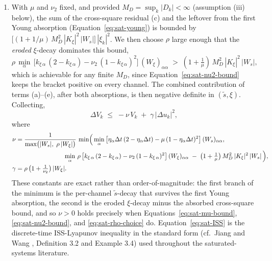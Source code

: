 \documentclass[conf]{new-aiaa}
\begin{document}
\begin{enumerate}
\item With $\mu$ and $\nu_2$ fixed, and provided $M_D = \sup_k |D_k| < \infty$ (assumption (iii) below), the sum of the cross-square residual (c) and the leftover from the first Young absorption (Equation~\ref{eq:sat-young}) is bounded by $\bigl[(1 + 1/\mu)\, M_D^2\, |K_\xi|^2\, |W_s|\bigr]\, |\xi_k|^2$. We then choose $\rho$ large enough that the \emph{eroded} $\xi$-decay dominates this bound,
\begin{equation}
\label{eq:sat-rho-choice}
\rho\, \min_\alpha\, \bigl[ k_{\xi\,\alpha}\,(2 - k_{\xi\,\alpha}) - \nu_2\,(1-k_{\xi\,\alpha})^2 \bigr]\,(W_\xi)_{\alpha\alpha} \;>\; (1 + \tfrac{1}{\mu})\, M_D^2\, |K_\xi|^2\, |W_s|,
\end{equation}
which is achievable for any finite $M_D$, since Equation~\ref{eq:sat-nu2-bound} keeps the bracket positive on every channel. The combined contribution of terms (a)–(e), after both absorptions, is then negative definite in $(\tilde s, \xi)$. Collecting,
\begin{equation}
\label{eq:sat-ISS}
\Delta V_k \;\leq\; -\nu\, V_k \;+\; \gamma\, |\Delta u_k|^2,
\end{equation}
where
\small
\begin{align}
\label{eq:sat-nu-exact}
\nu &= \frac{1}{\max\bigl(|W_s|,\; \rho\, |W_\xi|\bigr)}\, \min\Bigl(\, \min_\alpha\, \bigl[ \eta_\alpha \Delta t\,(2 - \eta_\alpha \Delta t) - \mu\,(1-\eta_\alpha \Delta t)^2 \bigr]\,(W_s)_{\alpha\alpha}, \notag \\
&\hspace{7.6em} \min_\alpha\, \rho\,\bigl[ k_{\xi\,\alpha}\,(2 - k_{\xi\,\alpha}) - \nu_2\,(1-k_{\xi\,\alpha})^2 \bigr]\,(W_\xi)_{\alpha\alpha} \;-\; \bigl(1 + \tfrac{1}{\mu}\bigr)\, M_D^2\, |K_\xi|^2\, |W_s| \,\Bigr), \\
\label{eq:sat-gamma-exact}
\gamma &= \rho\,\bigl(1 + \tfrac{1}{\nu_2}\bigr)\, |W_\xi|.
\end{align}
\normalsize
These constants are exact rather than order-of-magnitude: the first branch of the minimum is the per-channel $\tilde s$-decay that survives the first Young absorption, the second is the eroded $\xi$-decay minus the absorbed cross-square bound, and so $\nu > 0$ holds precisely when Equations~\ref{eq:sat-mu-bound}, \ref{eq:sat-nu2-bound}, and \ref{eq:sat-rho-choice} do. Equation~\ref{eq:sat-ISS} is the discrete-time ISS-Lyapunov inequality in the standard form (cf.\ Jiang and Wang \cite{refs:JiangWang2001}, Definition 3.2 and Example 3.4) used throughout the saturated-systems literature.
\end{enumerate}
\end{document}
